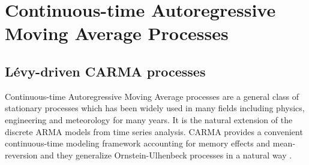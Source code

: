 \documentclass[10pt,a4paper,reqno]{amsart}
\theoremstyle{example}
\begin{document}
\section{Continuous-time Autoregressive Moving Average Processes}
\subsection{Lévy-driven CARMA processes}

Continuous-time Autoregressive Moving Average processes are a general class of stationary
processes which has been widely used in many fields including physics, engineering and meteorology for many
years. It is the natural extension of the discrete ARMA models from time series analysis.
CARMA provides a convenient continuous-time modeling framework accounting for memory effects and mean-reversion and they generalize Ornstein-Ulhenbeck processes in a natural way \cite{Bro01}. \medskip
\end{document}
